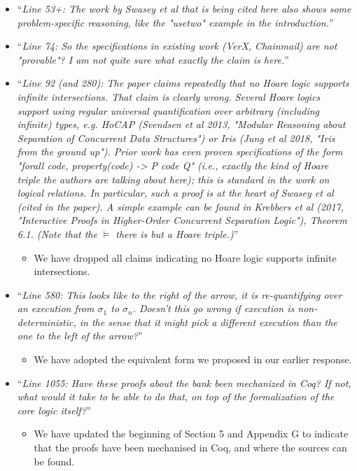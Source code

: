 \documentclass[11pt]{amsart}
\begin{document}
\begin{itemize}
\begin{itemize}
\item
``\emph{Line 53+: The work by Swasey et al that is being cited here also shows some problem-specific reasoning, like the "usetwo" example in the introduction.}''
\item
``\emph{Line 74: So the specifications in existing work (VerX, Chainmail) are not "provable"? I am not quite sure what exactly the claim is here.}''
\item
``\emph{Line 92 (and 280): The paper claims repeatedly that no Hoare logic supports infinite intersections. That claim is clearly wrong. Several Hoare logics support using regular universal quantification over arbitrary (including infinite) types, e.g. HoCAP (Svendsen et al 2013, "Modular Reasoning about Separation of Concurrent Data Structures") or Iris (Jung et al 2018, "Iris from the ground up"). Prior work has even proven specifications of the form "forall code, property(code) -> {P} code {Q}" (i.e., exactly the kind of Hoare triple the authors are talking about here); this is standard in the work on logical relations. In particular, such a proof is at the heart of Swasey et al (cited in the paper). A simple example can be found in Krebbers et al (2017, "Interactive Proofs in Higher-Order Concurrent Separation Logic"), Theorem 6.1. (Note that the $\vDash$ there is but a Hoare triple.)}''
\begin{itemize}
\item
We have dropped all claims indicating no Hoare logic supports infinite intersections.
\end{itemize}
\item
``\emph{Line 580: This looks like to the right of the arrow, it is re-quantifying over an execution from $\sigma_1$ to $\sigma_n$. Doesn't this go wrong if execution is non-deterministic, in the sense that it might pick a different execution than the one to the left of the arrow?}''
\begin{itemize}
\item
We have adopted the equivalent form we proposed in our earlier response.
\end{itemize}
\item
``\emph{Line 1055: Have these proofs about the bank been mechanized in Coq? If not, what would it take to be able to do that, on top of the formalization of the core logic itself?}''
\begin{itemize}
\item
We have updated the beginning of Section 5 and Appendix G to indicate that the proofs have been mechanised in Coq, and where the sources can be found.
\end{itemize}
\end{itemize}


\end{itemize}
\end{document}
